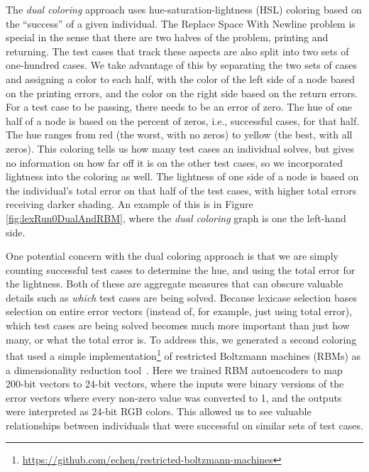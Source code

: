 \documentclass{sig-alternate}
\begin{document}
The \emph{dual coloring} approach uses hue-saturation-lightness (HSL) coloring
based on the ``success'' of a given individual. 
The Replace Space With Newline problem is special in the sense that there are 
two halves of the problem, printing and returning. The test cases that track 
these aspects are also split into two sets of one-hundred cases. We take 
advantage of this by separating the two sets of cases and assigning a color 
to each half, with the color of the left side of a node based on the
printing errors, and the color on the right side based on the return errors.
For a test case to be passing, there needs to be an error of zero. 
The hue of one half of a node is based on the percent of zeros, i.e., 
successful cases, for that half. The hue ranges from red (the worst, with no zeros) to yellow (the best, with all zeros). This coloring tells us how many test cases an individual solves, but gives no information on how far off it is on the other test cases, so we incorporated lightness into the coloring as well. The lightness of one side of a node is based on the individual's total error on that half of the test cases, with higher total errors receiving darker shading. An example of this is in Figure \ref{fig:lexRun0DualAndRBM}, where the \textit{dual coloring} graph is one the left-hand side.

One potential concern with the dual coloring approach is that we are simply 
counting successful test cases to determine the hue, and using the total
error for the lightness. Both of these are aggregate measures that can obscure
valuable details such as \emph{which} test cases are being solved. Because
lexicase selection bases selection on entire error vectors (instead of, for example,
just using total error), which test cases are being solved becomes much more
important than just how many, or what the total error is. To address this, we
generated a second coloring that used a simple 
implementation\footnote{\url{https://github.com/echen/restricted-boltzmann-machines}} 
of restricted Boltzmann machines (RBMs) as a dimensionality reduction 
tool~\cite{hinton2006reducing}. Here we trained RBM autoencoders to map 200-bit
vectors to 24-bit vectors, where the inputs were binary versions of the error
vectors where every non-zero value was converted to 1, and the outputs were
interpreted as 24-bit RGB colors. This allowed us to see valuable relationships
between individuals that were successful on similar sets of test cases. 
\end{document}
